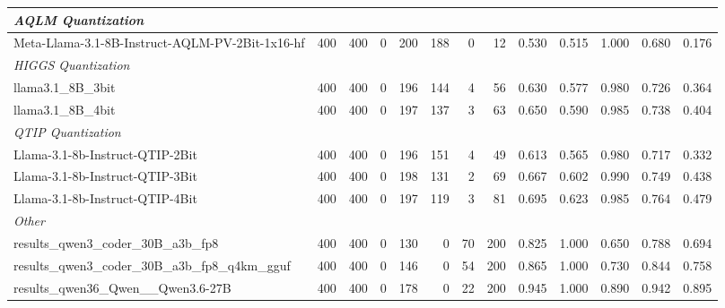 \begin{table}[htbp]
{\begin{tabular}{lrrrrrrrrrrrr}
    \midrule
    \multicolumn{13}{l}{\textit{AQLM Quantization}} \\
    \midrule
    Meta-Llama-3.1-8B-Instruct-AQLM-PV-2Bit-1x16-hf & 400 & 400 & 0 & 200 & 188 & 0 & 12 & 0.530 & 0.515 & 1.000 & 0.680 & 0.176 \\
    \midrule
    \multicolumn{13}{l}{\textit{HIGGS Quantization}} \\
    \midrule
    llama3.1\_8B\_3bit & 400 & 400 & 0 & 196 & 144 & 4 & 56 & 0.630 & 0.577 & 0.980 & 0.726 & 0.364 \\
    llama3.1\_8B\_4bit & 400 & 400 & 0 & 197 & 137 & 3 & 63 & 0.650 & 0.590 & 0.985 & 0.738 & 0.404 \\
    \midrule
    \multicolumn{13}{l}{\textit{QTIP Quantization}} \\
    \midrule
    Llama-3.1-8b-Instruct-QTIP-2Bit & 400 & 400 & 0 & 196 & 151 & 4 & 49 & 0.613 & 0.565 & 0.980 & 0.717 & 0.332 \\
    Llama-3.1-8b-Instruct-QTIP-3Bit & 400 & 400 & 0 & 198 & 131 & 2 & 69 & 0.667 & 0.602 & 0.990 & 0.749 & 0.438 \\
    Llama-3.1-8b-Instruct-QTIP-4Bit & 400 & 400 & 0 & 197 & 119 & 3 & 81 & 0.695 & 0.623 & 0.985 & 0.764 & 0.479 \\
    \midrule
    \multicolumn{13}{l}{\textit{Other}} \\
    \midrule
    results\_qwen3\_coder\_30B\_a3b\_fp8 & 400 & 400 & 0 & 130 & 0 & 70 & 200 & 0.825 & 1.000 & 0.650 & 0.788 & 0.694 \\
    results\_qwen3\_coder\_30B\_a3b\_fp8\_q4km\_gguf & 400 & 400 & 0 & 146 & 0 & 54 & 200 & 0.865 & 1.000 & 0.730 & 0.844 & 0.758 \\
    results\_qwen36\_Qwen\_\_Qwen3.6-27B & 400 & 400 & 0 & 178 & 0 & 22 & 200 & 0.945 & 1.000 & 0.890 & 0.942 & 0.895 \\
    \bottomrule
  \end{tabular}
  }
\end{table}

